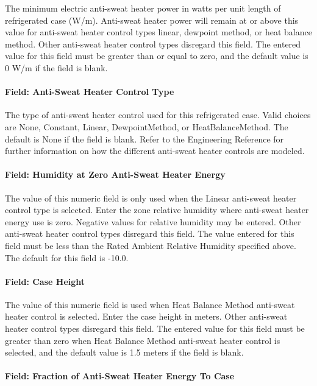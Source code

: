 The minimum electric anti-sweat heater power in watts per unit length of refrigerated case (W/m). Anti-sweat heater power will remain at or above this value for anti-sweat heater control types linear, dewpoint method, or heat balance method. Other anti-sweat heater control types disregard this field. The entered value for this field must be greater than or equal to zero, and the default value is 0 W/m if the field is blank.

\paragraph{Field: Anti-Sweat Heater Control Type}\label{field-anti-sweat-heater-control-type}

The type of anti-sweat heater control used for this refrigerated case. Valid choices are None, Constant, Linear, DewpointMethod, or HeatBalanceMethod. The default is None if the field is blank. Refer to the Engineering Reference for further information on how the different anti-sweat heater controls are modeled.

\paragraph{Field: Humidity at Zero Anti-Sweat Heater Energy}\label{field-humidity-at-zero-anti-sweat-heater-energy}

The value of this numeric field is only used when the Linear anti-sweat heater control type is selected. Enter the zone relative humidity where anti-sweat heater energy use is zero. Negative values for relative humidity may be entered. Other anti-sweat heater control types disregard this field. The value entered for this field must be less than the Rated Ambient Relative Humidity specified above. The default for this field is -10.0.

\paragraph{Field: Case Height}\label{field-case-height}

The value of this numeric field is used when Heat Balance Method anti-sweat heater control is selected. Enter the case height in meters. Other anti-sweat heater control types disregard this field. The entered value for this field must be greater than zero when Heat Balance Method anti-sweat heater control is selected, and the default value is 1.5 meters if the field is blank.

\paragraph{Field: Fraction of Anti-Sweat Heater Energy To Case}\label{field-fraction-of-anti-sweat-heater-energy-to-case}

